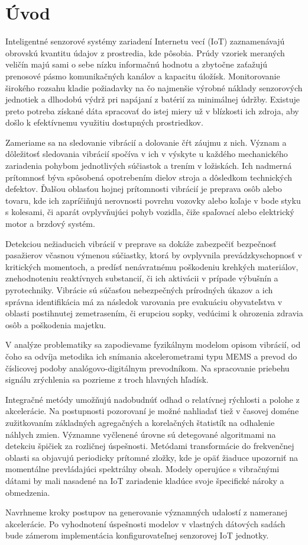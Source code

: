 \chapter{Úvod}
Inteligentné senzorové systémy zariadení Internetu vecí (IoT) zaznamenávajú obrovskú kvantitu údajov z prostredia, kde
pôsobia. Prúdy vzoriek meraných veličín majú sami o sebe nízku informačnú hodnotu a zbytočne zaťažujú
prenosové pásmo komunikačných kanálov a kapacitu úložísk. Monitorovanie širokého rozsahu kladie požiadavky
na čo najmenšie výrobné náklady senzorových jednotiek a dlhodobú výdrž pri napájaní z batérií za minimálnej údržby.
Existuje preto potreba získané dáta spracovať do istej miery už v blízkosti ich zdroja, aby došlo k efektívnemu
využitiu dostupných prostriedkov.

Zameriame sa na sledovanie vibrácií a dolovanie čŕt záujmu z nich. Význam a dôležitosť sledovania vibrácií spočíva v ich v
výskyte u každého mechanického zariadenia pohybom jednotlivých súčiastok a trením v ložiskách. Ich nadmerná prítomnosť
býva spôsobená opotrebením dielov stroja a dôsledkom technických defektov. Ďalšou oblasťou hojnej prítomnosti vibrácií
je preprava osôb alebo tovaru, kde ich zapríčiňujú nerovnosti povrchu vozovky alebo koľaje v bode styku s kolesami, či aparát
ovplyvňujúci pohyb vozidla, čiže spaľovací alebo elektrický motor a brzdový systém.

Detekciou nežiaducich vibrácií v preprave sa dokáže zabezpečiť bezpečnosť pasažierov včasnou výmenou súčiastky,
ktorá by ovplyvnila prevádzkyschopnosť v kritických momentoch, a predísť nenávratnému poškodeniu krehkých materiálov,
znehodnoteniu reaktívnych substancií, či ich aktivácii v prípade výbušnín a pyrotechniky. Vibrácie sú súčasťou
nebezpečných prírodných úkazov a ich správna identifikácia má za následok varovania pre evakuáciu obyvateľstva
v oblasti postihnutej zemetrasením, či erupciou sopky, vedúcimi k ohrozenia zdravia osôb a poškodenia majetku.

V analýze problematiky sa zapodievame fyzikálnym modelom opisom vibrácií, od čoho sa odvíja metodika ich snímania
akcelerometrami typu MEMS a prevod do číslicovej podoby analógovo-digitálnym prevodníkom. Na spracovanie priebehu
signálu zrýchlenia sa pozrieme z troch hlavných hľadísk.

Integračné metódy umožňujú nadobudnúť odhad o relatívnej rýchlosti a polohe z akcelerácie. Na postupnosti pozorovaní
je možné nahliadať tiež v časovej doméne zužitkovaním základných agregačných a korelačných štatistík na odhalenie
náhlych zmien. Významne vyčlenené úrovne sú detegované
algoritmami na detekciu špičiek za rozličnej úspešnosti. Metódami transformácie do frekvenčnej oblasti sa
objavujú periodicky prítomné zložky, kde je opäť žiaduce upozorniť na momentálne prevládajúci spektrálny obsah.
Modely operujúce s vibračnými dátami by mali nasadené na IoT zariadenie kladúce svoje špecifické nároky a
obmedzenia.

Navrhneme kroky postupov na generovanie významných udalostí z nameranej akcelerácie. Po vyhodnotení úspešnosti
modelov v vlastných dátových sadách bude zámerom implementácia konfigurovateľnej senzorovej IoT jednotky.